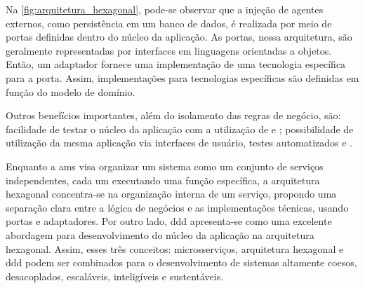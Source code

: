 Na \autoref{fig:arquitetura_hexagonal}, pode-se observar que a injeção de agentes externos, como persistência em um banco de dados, é realizada por meio de portas definidas dentro do núcleo da aplicação. As portas, nessa arquitetura, são geralmente representadas por interfaces em linguagens orientadas a objetos. Então, um adaptador fornece uma implementação de uma tecnologia específica para a porta. Assim, implementações para tecnologias específicas são definidas em função do modelo de domínio.

Outros benefícios importantes, além do isolamento das regras de negócio, são: facilidade de testar o núcleo da aplicação com a utilização de  e ; possibilidade de utilização da mesma aplicação via interfaces de usuário, testes automatizados e .

Enquanto a \acrfull{ams} visa organizar um sistema como um conjunto de serviços independentes, cada um executando uma função específica, a arquitetura hexagonal concentra-se na organização interna de um serviço, propondo uma separação clara entre a lógica de negócios e as implementações técnicas, usando portas e adaptadores. Por outro lado, \acrshort{ddd} apresenta-se como uma excelente abordagem para desenvolvimento do núcleo da aplicação na arquitetura hexagonal. Assim, esses três conceitos: microsserviços, arquitetura hexagonal e \acrshort{ddd} podem ser combinados para o desenvolvimento de sistemas altamente coesos, desacoplados, escaláveis, inteligíveis e sustentáveis.




